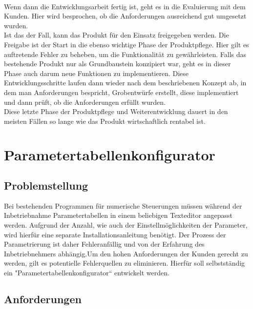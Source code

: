 \documentclass[10pt,a4paper]{article}
\begin{document}
\\Wenn dann die Entwicklungsarbeit fertig ist, geht es in die Evaluierung mit dem Kunden. Hier wird besprochen, ob die Anforderungen ausreichend gut umgesetzt wurden. 
\\Ist das der Fall, kann das Produkt für den Einsatz freigegeben werden. Die Freigabe ist der Start in die ebenso wichtige Phase der Produktpflege. Hier gilt es auftretende Fehler zu beheben, um die Funktionalität zu gewährleisten. Falls das bestehende Produkt nur als Grundbaustein konzipiert war, geht es in dieser Phase auch darum neue Funktionen zu implementieren. Diese Entwicklungsschritte laufen dann wieder nach dem beschriebenen Konzept ab, in dem man Anforderungen bespricht, Grobentwürfe erstellt, diese implementiert und dann prüft, ob die Anforderungen erfüllt wurden. 
\\Diese letzte Phase der Produktpflege und Weiterentwicklung dauert in den meisten Fällen so lange wie das Produkt wirtschaftlich rentabel ist. 
\section{Parametertabellenkonfigurator}
\subsection{Problemstellung}
Bei bestehenden Programmen für numerische Steuerungen müssen während der Inbetriebnahme Parametertabellen in einem beliebigen Texteditor angepasst werden. Aufgrund der Anzahl, wie auch der Einstellmöglichkeiten der Parameter, wird hierfür eine separate Installationsanleitung benötigt. Der Prozess der Parametrierung ist daher Fehleranfällig und von der Erfahrung des Inbetriebnehmers abhängig.Um den hohen Anforderungen der Kunden gerecht zu werden, gilt es potentielle Fehlerquellen zu eliminieren. Hierfür soll selbstständig ein "Parametertabellenkonfigurator“ entwickelt werden.\newpage
\subsection{Anforderungen}
 
\end{document}
